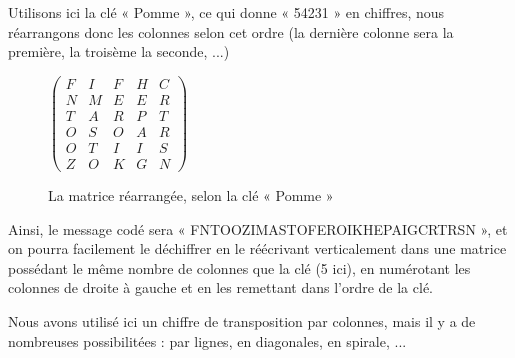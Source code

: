 Utilisons ici la clé « Pomme », ce qui donne « 54231 » en chiffres,
nous réarrangons donc les colonnes selon cet ordre (la dernière
colonne sera la première, la troisème la seconde, ...)

\begin{figure}[h]
  \begin{center}
  $
  \left(
    \begin{array}{ccccc}
      F & I & F & H & C \\ 
      N & M & E & E & R \\
      T & A & R & P & T \\
      O & S & O & A & R \\
      O & T & I & I & S \\
      Z & O & K & G & N
    \end{array}
  \right)
  $
  \end{center}
  \caption{La matrice réarrangée, selon la clé « Pomme »}
  \label{fig:TranspositionMatriceCode}
\end{figure}

Ainsi, le message codé sera « FNTOOZIMASTOFEROIKHEPAIGCRTRSN », et on
pourra facilement le déchiffrer en le réécrivant verticalement dans
une matrice possédant le même nombre de colonnes que la clé (5 ici),
en numérotant les colonnes de droite à gauche et en les remettant dans
l'ordre de la clé.

Nous avons utilisé ici un chiffre de transposition par colonnes, mais
il y a de nombreuses possibilitées : par lignes, en diagonales, en
spirale, ...
